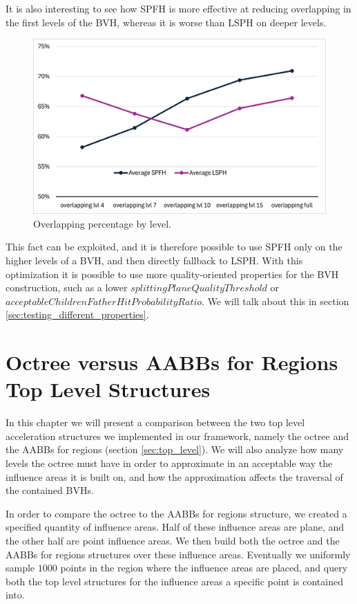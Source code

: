 \documentclass{PoliMi_MasterThesis}
\begin{document}
It is also interesting to see how SPFH is more effective at reducing overlapping in the first levels of the BVH, whereas it is worse than LSPH on deeper levels.

\begin{figure}[H] 
	\centering
	\includegraphics[width=\textwidth]{Images/overlapping_percentage_by_level.png}
	\caption{Overlapping percentage by level.}
	\label{fig:overlapping_percentage_by_level}
\end{figure} 

This fact can be exploited, and it is therefore possible to use SPFH only on the higher levels of a BVH, and then directly fallback to LSPH. With this optimization it is possible to use more quality-oriented properties for the BVH construction, such as a lower $splittingPlaneQualityThreshold$ or $acceptableChildrenFatherHitProbabilityRatio$. We will talk about this in section \ref{sec:testing_different_properties}.

\section{Octree versus AABBs for Regions Top Level Structures} \label{sec:octree_vs_aabbs}
In this chapter we will present a comparison between the two top level acceleration structures we implemented in our framework, namely the octree and the AABBs for regions (section \ref{sec:top_level}). We will also analyze how many levels the octree must have in order to approximate in an acceptable way the influence areas it is built on, and how the approximation affects the traversal of the contained BVHs.

In order to compare the octree to the AABBs for regions structure, we created a specified quantity of influence areas. Half of these influence areas are plane, and the other half are point influence areas. We then build both the octree and the AABBs for regions structures over these influence areas. Eventually we uniformly sample $1000$ points in the region where the influence areas are placed, and query both the top level structures for the influence areas a specific point is contained into.
\end{document}
